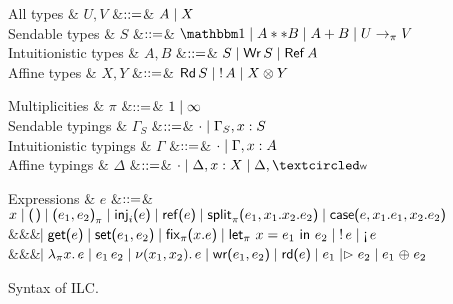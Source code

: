 \begin{figure*}[t]
  \centering
  \begin{minipage}{.475\textwidth}
    \centering
    \begin{grammar}
      All types
      & $U, V$
      &$\mathrel{::=}$& $A \mathrel{\mid} X$
      \\
      Sendable types
      & $S$
      &$\mathrel{::=}$& $\tyUnit \bnfalt A ** B \bnfalt \tySum{A}{B} \bnfalt \tyArr{U}{\pi}{V}$
      \\
      Intuitionistic types
      & $A,B$
      &$\mathrel{::=}$& $S \mathrel{\mid} \text{\textsf{Wr}}\,S \mathrel{\mid} \text{\textsf{Ref}}\,A$
      \\
      Affine types
      & $X,Y$
      &$\mathrel{::=}$& $\text{\textsf{Rd}}\,S \mathrel{\mid} {!}\,{A} \mathrel{\mid}
      {X}\otimes{Y}$
    \end{grammar}
  \end{minipage}%
  \begin{minipage}{.475\textwidth}
    \centering
    \begin{grammar}
      Multiplicities
      & $\pi$
      &$\mathrel{::=}$& $1 \mathrel{\mid} \infty$    
      \\
      Sendable typings
      & ${\Gamma}_S$
      &$\mathrel{::=}$& $\cdot \mathrel{\mid} {\Gamma}_S,x:S$
      \\
      Intuitionistic typings
      & $\Gamma$
      &$\mathrel{::=}$& $\cdot \mathrel{\mid} \Gamma,x:A$
      \\
      Affine typings
      & $\Delta$
      &$\mathrel{::=}$& $\emptyctxt \bnfalt \Delta,x:X \bnfalt \Delta, \wrtok$
    \end{grammar}
  \end{minipage}
  \begin{grammar}
    Expressions
    & $e$
    &$\mathrel{::=}$&
    $\eVar{x} \bnfalt \eUnit \bnfalt \ePair{e_1}{e_2}{\pi} \bnfalt \eInj{i}{e}
    \bnfalt \eRef{e} \bnfalt \eSplit{e_1}{x_1}{x_2}{e_2} \bnfalt
    \eCase{e}{x_1}{e_1}{x_2}{e_2}$
    \\ &&& $\hspace{-1.02ex}\mathrel{\mid} \text{\textsf{get}}\textsf{(}{e}\textsf{)} \mathrel{\mid} \text{\textsf{set}}\textsf{(}{e_1},{e_2}\textsf{)} \mathrel{\mid} \text{\textsf{fix}}_{\pi}\textsf{(}{x}.{e}\textsf{)}
    \mathrel{\mid} \text{\textsf{let}}_{\pi}\ {x} = {e_1}\ \text{\textsf{in}}\ {e_2} \mathrel{\mid} {!}\,{e} \mathrel{\mid} \textnormal{!`}\,{e}$
    \\ &&& $\hspace{-1.02ex}\mathrel{\mid} \lambda_{\pi} {x}.\,{e} \mathrel{\mid} e_1\,e_2
    \mathrel{\mid} \nu(x_1,x_2).\,e \mathrel{\mid} \text{\textsf{wr}}\textsf{(}{e_1},{e_2}\textsf{)}
    \mathrel{\mid} \text{\textsf{rd}}\textsf{(}{e}\textsf{)} \mathrel{\mid} e_1 \mathrel{|\rhd} e_2 \mathrel{\mid} e_1 \mathrel{\oplus} e_2$
  \end{grammar}      
  \caption{Syntax of ILC.}
  \label{fig:ilc-syntax}
\end{figure*}

